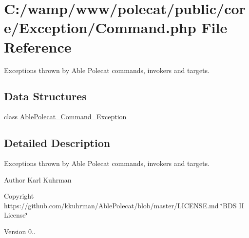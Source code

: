 \hypertarget{_exception_2_command_8php}{}\section{C\+:/wamp/www/polecat/public/core/\+Exception/\+Command.php File Reference}
\label{_exception_2_command_8php}


Exceptions thrown by Able Polecat commands, invokers and targets.  


\subsection*{Data Structures}
\begin{DoxyCompactItemize}
\item 
class \hyperlink{class_able_polecat___command___exception}{Able\+Polecat\+\_\+\+Command\+\_\+\+Exception}
\end{DoxyCompactItemize}


\subsection{Detailed Description}
Exceptions thrown by Able Polecat commands, invokers and targets. 

\begin{DoxyAuthor}{Author}
Karl Kuhrman 
\end{DoxyAuthor}
\begin{DoxyCopyright}{Copyright}
https\+://github.com/kkuhrman/\+Able\+Polecat/blob/master/\+L\+I\+C\+E\+N\+S\+E.\+md \char`\"{}\+B\+D\+S I\+I License\char`\"{} 
\end{DoxyCopyright}
\begin{DoxyVersion}{Version}
0.. 
\end{DoxyVersion}
